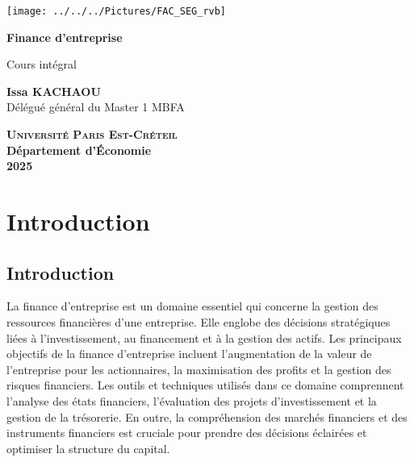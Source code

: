 \documentclass[a4paper, 12pt]{report}
\begin{document}
	
	
\begin{titlepage}
	\centering
	\begin{center}
		\texttt{[image: ../../../Pictures/FAC\_SEG\_rvb]}
	\end{center}
	\vspace*{2cm}
	
	\Huge
	
	\textbf{Finance d'entreprise}
	\vspace{1.5cm}
	
	\Large
	Cours intégral
	
	\vspace{2cm}
	
	\textbf{Issa KACHAOU} \\
	{\normalsize Délégué général du Master 1 MBFA}
	
	
	\vfill
	
	\Large
	
	\textsc{\textbf{Université Paris Est-Créteil}}	 \\
	\textbf{Département d'\'Economie} \\
	\textbf{2025}
	
\end{titlepage}
\thispagestyle{empty}
\newpage
\clearpage
\mbox{}
\thispagestyle{empty}

\tableofcontents

\thispagestyle{empty}
\newpage
\mbox{}
\thispagestyle{empty} %
	
\pagestyle{plain} 
\chapter*{Introduction}	

\section{Introduction}

La finance d'entreprise est un domaine essentiel qui concerne la gestion des ressources financières d'une entreprise. Elle englobe des décisions stratégiques liées à l'investissement, au financement et à la gestion des actifs. Les principaux objectifs de la finance d'entreprise incluent l'augmentation de la valeur de l'entreprise pour les actionnaires, la maximisation des profits et la gestion des risques financiers. Les outils et techniques utilisés dans ce domaine comprennent l'analyse des états financiers, l'évaluation des projets d'investissement et la gestion de la trésorerie. En outre, la compréhension des marchés financiers et des instruments financiers est cruciale pour prendre des décisions éclairées et optimiser la structure du capital.
\end{document}
